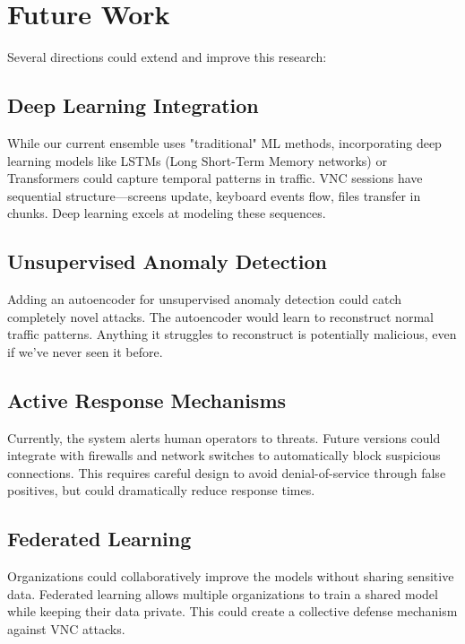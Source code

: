 \documentclass[conference]{IEEEtran}
\begin{document}
\section{Future Work}

Several directions could extend and improve this research:

\subsection{Deep Learning Integration}

While our current ensemble uses "traditional" ML methods, incorporating deep learning models like LSTMs (Long Short-Term Memory networks) or Transformers could capture temporal patterns in traffic. VNC sessions have sequential structure—screens update, keyboard events flow, files transfer in chunks. Deep learning excels at modeling these sequences.

\subsection{Unsupervised Anomaly Detection}

Adding an autoencoder for unsupervised anomaly detection could catch completely novel attacks. The autoencoder would learn to reconstruct normal traffic patterns. Anything it struggles to reconstruct is potentially malicious, even if we've never seen it before.

\subsection{Active Response Mechanisms}

Currently, the system alerts human operators to threats. Future versions could integrate with firewalls and network switches to automatically block suspicious connections. This requires careful design to avoid denial-of-service through false positives, but could dramatically reduce response times.

\subsection{Federated Learning}

Organizations could collaboratively improve the models without sharing sensitive data. Federated learning allows multiple organizations to train a shared model while keeping their data private. This could create a collective defense mechanism against VNC attacks.
\end{document}
